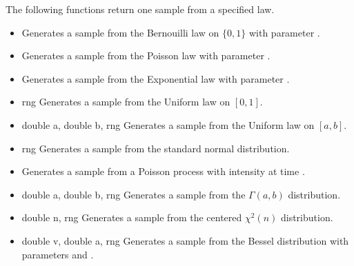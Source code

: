 The following functions return one sample from a specified law.
\begin{itemize}
\item {}
  \sshortdescribe Generates a sample from the Bernouilli law on $\{0, 1\}$ with
  parameter .

\item {}
  \sshortdescribe Generates a sample from the Poisson law with
  parameter .

\item {}
  \sshortdescribe Generates a sample from the Exponential law with
  parameter .

\item {} { \ptr rng}
  \sshortdescribe Generates a sample from the Uniform law on $[0, 1]$.

\item {} {double a, double b,
     \ptr rng}
  \sshortdescribe Generates a sample from the Uniform law on $[a, b]$.

\item {} { \ptr rng}
  \sshortdescribe Generates a sample from the standard normal distribution.

\item {}
  \sshortdescribe Generates a sample from a Poisson process with intensity
   at time .

\item {} {double a, double b,  \ptr rng}
  \sshortdescribe Generates a sample from the $\Gamma(a, b)$ distribution.

\item {} {double n,  \ptr rng}
  \sshortdescribe Generates a sample from the centered $\chi^2(n)$ distribution.
\item {} {double v, double a, \ptr rng}
  \sshortdescribe Generates a sample from the Bessel distribution with parameters
   and .
\end{itemize}

